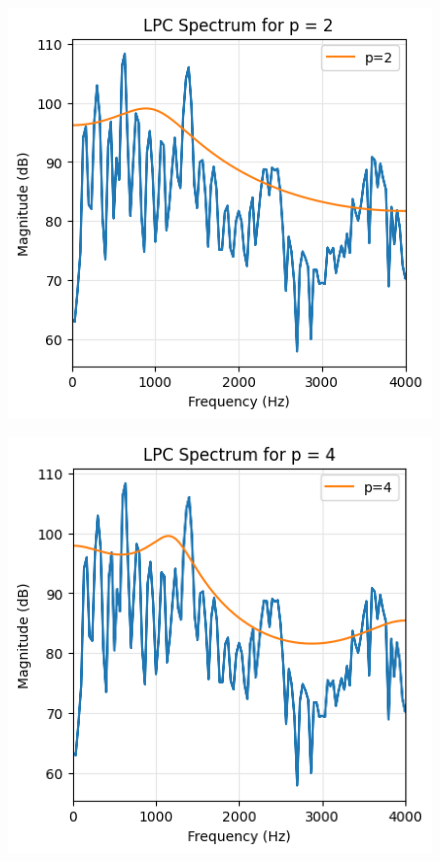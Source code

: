 \documentclass{article}
\begin{document}
\begin{figure}[H]
\begin{center}
\includegraphics[scale = 0.8]{2p.png}
\end{center}
\end{figure}

\begin{figure}[H]
\begin{center}
\includegraphics[scale = 0.8]{4p.png}
\end{center}
\end{figure}
\end{document}
